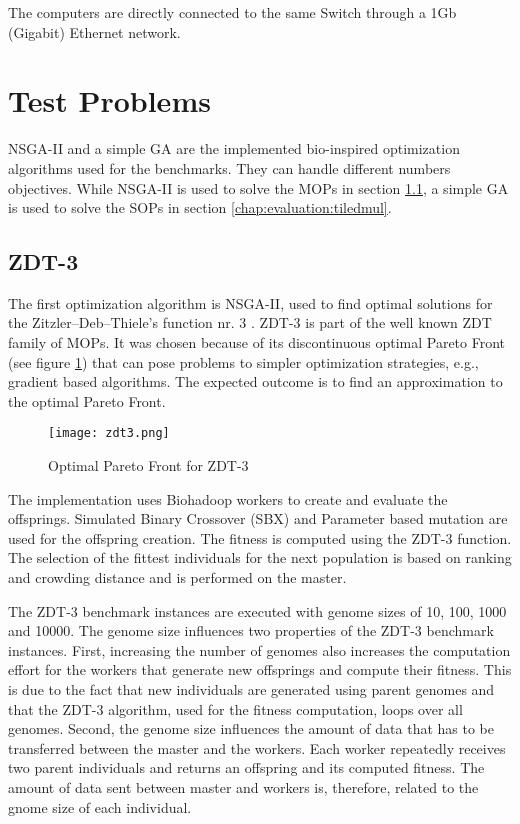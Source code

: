 The computers are directly connected to the same Switch through a 1Gb (Gigabit) Ethernet network.

\section{Test Problems}
\label{chap:evaluation:testproblems}
NSGA-II and a simple GA are the implemented bio-inspired optimization algorithms used for the benchmarks. They can handle different numbers objectives. While NSGA-II is used to solve the MOPs in section \ref{chap:evaluation:zdt3}, a simple GA is used to solve the SOPs in section \ref{chap:evaluation:tiledmul}.

\subsection{ZDT-3}
\label{chap:evaluation:zdt3}
The first optimization algorithm is NSGA-II, used to find optimal solutions for the Zitzler–Deb–Thiele's function nr. 3 \cite{zitzler2000comparison}. ZDT-3 is part of the well known ZDT family of MOPs. It was chosen because of its discontinuous optimal Pareto Front (see figure \ref{fig:zdt3}) that can pose problems to simpler optimization strategies, e.g., gradient based algorithms. The expected outcome is to find an approximation to the optimal Pareto Front.

\begin{figure}
  \centering
  \texttt{[image: zdt3.png]}
  \caption[Optimal Pareto Front for ZDT-3]{Optimal Pareto Front for ZDT-3}
  \label{fig:zdt3}
\end{figure}

The implementation uses Biohadoop workers to create and evaluate the offsprings. Simulated Binary Crossover (SBX) and Parameter based mutation \cite{deb2000efficient} are used for the offspring creation. The fitness is computed using the ZDT-3 function. The selection of the fittest individuals for the next population is based on ranking and crowding distance and is performed on the master.

The ZDT-3 benchmark instances are executed with genome sizes of 10, 100, 1000 and 10000. The genome size influences two properties of the ZDT-3 benchmark instances. First, increasing the number of genomes also increases the computation effort for the workers that generate new offsprings and compute their fitness. This is due to the fact that new individuals are generated using parent genomes and that the ZDT-3 algorithm, used for the fitness computation, loops over all genomes. Second, the genome size influences the amount of data that has to be transferred between the master and the workers. Each worker repeatedly receives two parent individuals and returns an offspring and its computed fitness. The amount of data sent between master and workers is, therefore, related to the gnome size of each individual.

